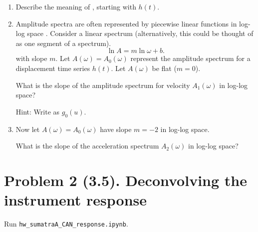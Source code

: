 \documentclass[11pt,titlepage,fleqn]{article}
\newcommand{\fft}{h}
\newcommand{\tfileresponse}{{\tt hw\_sumatraA\_CAN\_response.ipynb}}
\begin{document}
\begin{enumerate}
\begin{enumerate}
\item Describe the meaning of , starting with $\fft(t)$.

\item Amplitude spectra are often represented by piecewise linear functions in log-log space \citep[\eg][Figs.~6.3-6 and 6.6-8]{SteinWysession}. Consider a linear spectrum (alternatively, this could be thought of as one segment of a spectrum).
%
\begin{equation}
\ln A = m \ln\omega + b.
\label{Alin}
\end{equation}
%
with slope $m$.
Let $A(\omega) = A_0(\omega)$ represent the amplitude spectrum for a displacement time series $\fft(t)$. Let $A(\omega)$ be flat ($m=0$).

What is the slope of the amplitude spectrum for velocity $A_1(\omega)$ in log-log space?

Hint: Write  as $g_0(u)$.

\item Now let $A(\omega) = A_0(\omega)$ have slope $m=-2$ in log-log space.

What is the slope of the acceleration spectrum $A_2(\omega)$ in log-log space?

\end{enumerate}

\end{enumerate}


\section*{Problem 2 (3.5). Deconvolving the instrument response}

Run \tfileresponse.
\end{document}
